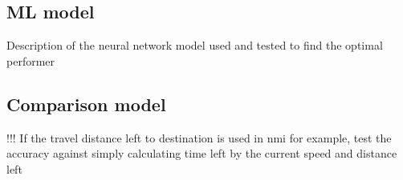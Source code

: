 \documentclass[../main.tex]{subfiles}
\begin{document}
\subsection{ML model}

Description of the neural network model used and tested to find the optimal performer


\subsection{Comparison model}

!!! If the travel distance left to destination is used in nmi for example, test the accuracy against simply calculating time left by the current speed and distance left 
\end{document}
